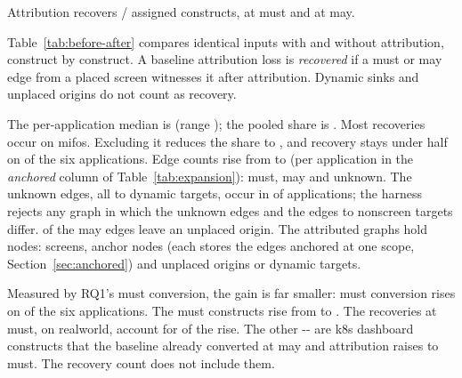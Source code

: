 Attribution recovers \AttrRecovered{}/\AttrLost{} assigned constructs, \AttrRecoveredMust{} at must and
\AttrRecoveredMay{} at may.

Table~\ref{tab:before-after} compares identical inputs with and without attribution, construct by
construct. A baseline attribution loss is \emph{recovered} if a
must or may edge from a placed screen witnesses it after attribution. Dynamic sinks and unplaced
origins do not count as recovery.

\begin{table}[t]\footnotesize
\caption{Before $\to$ after scope attribution, on the final evaluated snapshot.}
\label{tab:before-after}
\setlength{\tabcolsep}{4pt}
\TabBeforeAfter
\par{}
\end{table}

The per-application median is
\AttrRecoveredMedian{} (range \AttrRecoveredRange{}); the pooled share is \AttrRecoveredShare{}.
Most recoveries occur on mifos. Excluding it reduces the share to \AttrRecoveredShareNoMifos{}, and
recovery stays under half on \AttrUnderHalfApps{} of the six applications. Edge counts rise from
\AttrEdgesBefore{} to \AttrEdgesAfter{} (per application in the \emph{anchored} column of
Table~\ref{tab:expansion}): \CensusMust{} must, \CensusMay{} may and \CensusUnknown{} unknown. The
unknown edges, all to dynamic targets, occur in \CensusUnknownApps{} of \CensusApps{} applications;
the harness rejects any graph in which the unknown edges and the edges to nonscreen targets differ.
\CensusMaySourceNotScreen{} of the may edges leave an unplaced origin. The
attributed graphs hold \CensusNodes{} nodes: \CensusScreens{} screens, \CensusAnchors{} anchor nodes (each stores the edges anchored at one scope, Section~\ref{sec:anchored}) and
\CensusOtherNodes{} unplaced origins or dynamic targets.

Measured by RQ1's must conversion, the gain is far smaller: must
conversion rises on \AttrAppsGained{} of the six applications. The must constructs rise from
\CensusBaseMustSites{} to \CensusMustSites{}. The recoveries at must, on realworld, account for
\AttrRecoveredMust{} of the rise. The other
\the\numexpr\CensusMustSites-\CensusBaseMustSites-\AttrRecoveredMust\relax{} are k8s dashboard
constructs that the baseline already converted at may and attribution raises to must. The recovery count does not include them.


